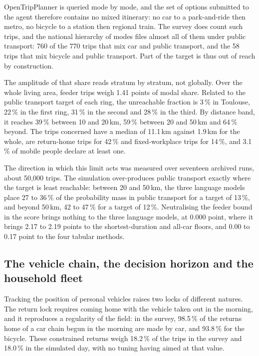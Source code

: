 OpenTripPlanner is queried mode by mode, and the set of options submitted to the agent therefore contains no mixed itinerary: no car to a park-and-ride then metro, no bicycle to a station then regional train. The survey does count such trips, and the national hierarchy of modes files almost all of them under public transport: 760 of the 770 trips that mix car and public transport, and the 58 trips that mix bicycle and public transport. Part of the target is thus out of reach by construction.

The amplitude of that share reads stratum by stratum, not globally. Over the whole living area, feeder trips weigh 1.41 points of modal share. Related to the public transport target of each ring, the unreachable fraction is 3\,\% in Toulouse, 22\,\% in the first ring, 31\,\% in the second and 28\,\% in the third. By distance band, it reaches 39\,\% between 10 and 20\,km, 59\,\% between 20 and 50\,km and 64\,\% beyond. The trips concerned have a median of 11.1\,km against 1.9\,km for the whole, are return-home trips for 42\,\% and fixed-workplace trips for 14\,\%, and 3.1\,\% of mobile people declare at least one.

The direction in which this limit acts was measured over seventeen archived runs, about 50{,}000 trips. The simulation over-produces public transport exactly where the target is least reachable: between 20 and 50\,km, the three language models place 27 to 36\,\% of the probability mass in public transport for a target of 13\,\%, and beyond 50\,km, 42 to 47\,\% for a target of 12\,\%. Neutralising the feeder bound in the score brings nothing to the three language models, at 0.000 point, where it brings 2.17 to 2.19 points to the shortest-duration and all-car floors, and 0.00 to 0.17 point to the four tabular methods.

\subsection{The vehicle chain, the decision horizon and the household fleet}
\label{sec:chain-limits}

Tracking the position of personal vehicles raises two locks of different natures. The return lock requires coming home with the vehicle taken out in the morning, and it reproduces a regularity of the field: in the survey, 98.5\,\% of the returns home of a car chain begun in the morning are made by car, and 93.8\,\% for the bicycle. These constrained returns weigh 18.2\,\% of the trips in the survey and 18.0\,\% in the simulated day, with no tuning having aimed at that value.

